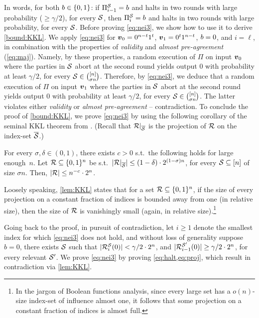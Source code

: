 \noindent
In words, for both $b\in \{0,1\}$: if $\Pi_{i-1}^{\mathcal{S}}=b$ and halts in two rounds with large probability ($\ge \gamma/2$), for every $\mathcal{S}$, then $\Pi_i^{\mathcal{S}}=b$ and halts in two rounds with large probability, for every $\mathcal{S}$. Before proving \cref{eq:nei3}, we show how to use it to derive \cref{bound:KKL}. We apply \cref{eq:nei3} for
${ \boldsymbol{v}}_0=0^{n-t}1^{t}$, ${ \boldsymbol{v}}_1=0^{t}1^{n-t}$, $b=0$, and $i=\ell$, in combination with the properties of \emph{validity} and \emph{almost pre-agreement} (\cref{eq:maj}). Namely, by these properties, a random execution of $\Pi$ on input ${ \boldsymbol{v}}_0$ where the parties in $\mathcal{S}$ abort at the second round yields output $0$ with probability at least $\gamma/2$, for every $\mathcal{S}\in {\binom{[n]}{\sigma n}}$.
Therefore, by \cref{eq:nei3}, we deduce that a random execution of $\Pi$ on input ${ \boldsymbol{v}}_1$ where the parties in $\mathcal{S}$ abort at the second round yields output $0$ with probability at least $\gamma/2$, for every $\mathcal{S}\in {\binom{[n]}{\sigma n}}$. The latter violates either \emph{validity} or \emph{almost pre-agreement} -- contradiction.
To conclude the proof of \cref{bound:KKL}, we prove \cref{eq:nei3} by using the following corollary of the seminal KKL theorem \cite{KKL88} from \citet{BKK14}.
(Recall that $\mathcal{R}|_{\overline{\mathcal{S}}}$ is the projection of $\mathcal{R}$ on the index-set $\overline{\mathcal{S}}$.)

\begin{lemma}\label{lem:KKL} For every $\sigma, \delta\in (0,1)$, there exists $c>0$ s.t.\
the following holds for large enough~$n$. Let $\mathcal{R} \subseteq {\{0,1\}^n}$ be s.t.\
$|\mathcal{R}|_{\overline{\mathcal{S}}}|\le (1-\delta)\cdot 2^{(1-\sigma)n}$, for every $\mathcal{S}\subseteq [n]$ of size $\sigma n$. Then, $\left|\mathcal{R}\right|\le n^{-c}\cdot 2^n$.
\end{lemma}

Loosely speaking, \cref{lem:KKL} states that for a set $\mathcal{R}\subseteq {\{0,1\}^n}$, if the size of every projection on a constant fraction of indices is bounded away from one (in relative size), then the size of $\mathcal{R}$ is vanishingly small
(again, in relative size).\footnote{In the jargon of Boolean functions analysis, since every large set has a $o(n)$-size index-set of influence almost one, it follows that some projection on a constant fraction of indices is almost full.}

Going back to the proof, in pursuit of contradiction, let $i\ge 1$ denote the smallest index for which \cref{eq:nei3} does not hold, and without loss of generality suppose $b=0$, \ie there exists $\mathcal{S}$ such that $|\mathcal{R}_{i}^{\mathcal{S}}(0)|< \gamma/2 \cdot 2^{n}$, and $|\mathcal{R}_{i-1}^{\mathcal{S}'}(0)|\ge \gamma/2 \cdot 2^n$, for every relevant $\mathcal{S}'$. We prove \cref{eq:nei3} by proving \cref{eq:halt,eq:proj}, which result in contradiction via \cref{lem:KKL}.

